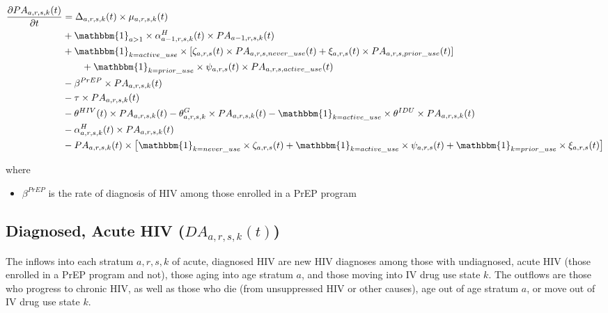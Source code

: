 \documentclass{article}
\begin{document}
\begin{align*}
\frac{\partial PA_{a,r,s,k}(t)}{\partial t} 
&= \Delta_{a,r,s,k}(t) \times \mu_{a,r,s,k}(t)\\
&+ \mathbbm{1}_{a>1} \times \alpha_{a-1,r,s,k}^H(t) \times PA_{a-1,r,s,k}(t) \\
&+ \mathbbm{1}_{k=active\_use} \times [\zeta_{a,r,s}(t) \times PA_{a,r,s,never\_use}(t) + \xi_{a,r,s}(t) \times PA_{a,r,s,prior\_use}(t)]\\
&\qquad + \mathbbm{1}_{k=prior\_use} \times \psi_{a,r,s}(t) \times PA_{a,r,s,active\_use}(t)\\
&- \beta^{PrEP} \times PA_{a,r,s,k}(t) \\
&- \tau \times PA_{a,r,s,k}(t) \\
&- \theta^{HIV}(t) \times PA_{a,r,s,k}(t)  
- \theta^G_{a,r,s,k} \times PA_{a,r,s,k}(t) 
- \mathbbm{1}_{k=active\_use} \times \theta^{IDU} \times PA_{a,r,s,k}(t) \\
&- \alpha_{a,r,s,k}^H(t) \times PA_{a,r,s,k}(t) \\
&- PA_{a,r,s,k}(t) \times \big[\mathbbm{1}_{k=never\_use} \times \zeta_{a,r,s}(t) + \mathbbm{1}_{k=active\_use} \times \psi_{a,r,s}(t) + \mathbbm{1}_{k=prior\_use} \times \xi_{a,r,s}(t)\big]
\end{align*}

where
\begin{itemize}
	\item $\beta^{PrEP}$ is the rate of diagnosis of HIV among those enrolled in a PrEP program
\end{itemize}

\subsection{Diagnosed, Acute HIV \big($DA_{a,r,s,k}(t)$\big)}

The inflows into each stratum $a,r,s,k$ of acute, diagnosed HIV are new HIV diagnoses among those with undiagnosed, acute HIV (those enrolled in a PrEP program and not), those aging into age stratum $a$, and those moving into IV drug use state $k$. The outflows are those who progress to chronic HIV, as well as those who die (from unsuppressed HIV or other causes), age out of age stratum $a$, or move out of IV drug use state $k$.
\end{document}
